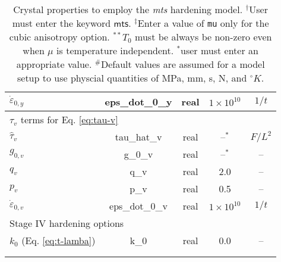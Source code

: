 \documentclass[11pt]{report}
\numberwithin{equation}{section}
\newcommand{\ttt} {\texttt}  %
\newcommand{\hv} {\mathsf}   %
\newcommand{\ti}{\emph}
\begin{document}
\begin{longtable}{|l|c|c|c|c|}
\hspace{1em}$\dot{\varepsilon}_{0,y}$ & eps\_dot\_0\_y & real&$1\times 10^{10}$&$1/t$\tabularnewline\hline\hline
\multicolumn{4}{|l|}{$\tau_v$ terms for Eq. \ref{eq:tau-v}} \tabularnewline \hline
\hspace{1em}$\hat{\tau}_{v}$ & tau\_hat\_v & real&--$^*$&$F/L^2$\tabularnewline \hline
\hspace{1em}$g_{0,v}$ & g\_0\_v & real&--$^*$&--\tabularnewline \hline
\hspace{1em}$q_{v}$ & q\_v & real&2.0&--\tabularnewline \hline
\hspace{1em}$p_{v}$ & p\_v & real&0.5&--\tabularnewline \hline
\hspace{1em}$\dot{\varepsilon}_{0,v}$ & eps\_dot\_0\_v & real&$1\times 10^{10}$&$1/t$\tabularnewline \hline\hline
\multicolumn{4}{|l|}{Stage IV hardening options} &\tabularnewline \hline
\hspace{1em}$k_{0}$ (Eq. \ref{eq:t-lamba}) & k\_0 & real&0.0&--\tabularnewline \hline 
\multicolumn{4}{l}{} \\[-5pt]  %
\caption{
Crystal properties to employ the \ti{mts} hardening model. $^\dag$User must
enter the keyword $\hv{mts}$. 
$^\ddag$Enter a value of  \ttt{mu} only
for the cubic anisotropy option.  $^{**}T_0$ must be always be non-zero even when $\mu$ is temperature
independent. $^*$user must enter an appropriate value. $^\#$Default values are assumed for a model setup to use
physcial quantities of MPa, mm, s, N, and $^\circ K$.
  \label{tab:crys-mts}}\\
\end{longtable}
\normalsize
\end{document}
